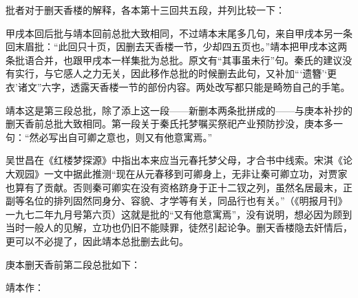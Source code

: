 \par 批者对于删天香楼的解释，各本第十三回共五段，并列比较一下：
\par 甲戌本回后批与靖本回前总批大致相同，不过靖本末尾多几句，来自甲戌本另一条回末眉批：“此回只十页，因删去天香楼一节，少却四五页也。”靖本把甲戌本这两条批语合并，也跟甲戌本一样集批为总批。原文有“其事虽未行”句。秦氏的建议没有实行，与它感人之力无关，因此移作总批的时候删去此句，又补加“‘遗簪’‘更衣’诸文”六字，透露天香楼一节的部份内容。两处改写都只能是畸笏自己的手笔。
\par 靖本这是第三段总批，除了添上这一段——新删本两条批拼成的——与庚本补抄的删天香前总批大致相同。第一段关于秦氏托梦嘱买祭祀产业预防抄没，庚本多一句：“然必写出自可卿之意也，则又有他意寓焉。”
\par 吴世昌在《红楼梦探源》中指出本来应当元春托梦父母，才合书中线索。宋淇《论大观园》一文中据此推测“现在从元春移到可卿身上，无非让秦可卿立功，对贾家也算有了贡献。否则秦可卿实在没有资格跻身于正十二钗之列，虽然名居最末，正副等名位的排列固然同身分、容貌、才学等有关，同品行也有关。”（《明报月刊》一九七二年九月号第六页）这就是批的“又有他意寓焉”，没有说明，想必因为顾到当时一般人的见解，立功也仍旧不能赎罪，徒然引起论争。删天香楼隐去奸情后，更可以不必提了，因此靖本总批删去此句。
\par 庚本删天香前第二段总批如下：
\par 靖本作：
